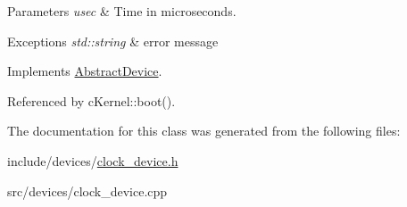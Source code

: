 \begin{DoxyParams}{\-Parameters}
{\em usec} & \-Time in microseconds.\\
\hline
\end{DoxyParams}

\begin{DoxyExceptions}{\-Exceptions}
{\em std\-::string} & error message \\
\hline
\end{DoxyExceptions}


\-Implements \hyperlink{classAbstractDevice}{\-Abstract\-Device}.



\-Referenced by c\-Kernel\-::boot().



\-The documentation for this class was generated from the following files\-:\begin{DoxyCompactItemize}
\item 
include/devices/\hyperlink{clock__device_8h}{clock\-\_\-device.\-h}\item 
src/devices/clock\-\_\-device.\-cpp\end{DoxyCompactItemize}
